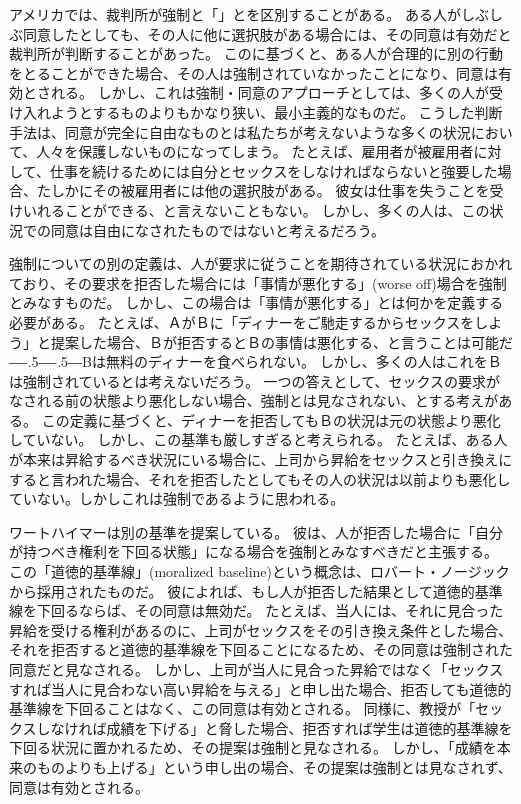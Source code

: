 \documentclass[paper=a4,book,openany]{jlreq}
\newcommand{\ig}[1]{}           %
\def\DDASH{―\kern-.5\zw―\kern-.5\zw―} %
\begin{document}
アメリカでは、裁判所が強制と「」とを区別することがある。
ある人がしぶしぶ同意したとしても、その人に他に選択肢がある場合には、その同意は有効だと裁判所が判断することがあった\citep[p.130]{buchhandler-raphael11:_failur_consen}。
このに基づくと、ある人が合理的に別の行動をとることができた場合、その人は強制されていなかったことになり、同意は有効とされる。
しかし、これは強制・同意のアプローチとしては、多くの人が受け入れようとするものよりもかなり狭い、最小主義的なものだ。
こうした判断手法は、同意が完全に自由なものとは私たちが考えないような多くの状況において、人々を保護しないものになってしまう。
たとえば、雇用者が被雇用者に対して、仕事を続けるためには自分とセックスをしなければならないと強要した場合、たしかにその被雇用者には他の選択肢がある。
彼女は仕事を失うことを受けいれることができる、と言えないこともない。
しかし、多くの人は、この状況での同意は自由になされたものではないと考えるだろう。

強制についての別の定義は、人が要求に従うことを期待されている状況におかれており、その要求を拒否した場合には「事情が悪化する」(worse off)場合を強制とみなすものだ。
しかし、この場合は「事情が悪化する」とは何かを定義する必要がある。
たとえば、ＡがＢに「ディナーをご馳走するからセックスをしよう」と提案した場合、Ｂが拒否するとＢの事情は悪化する、と言うことは可能だ{\DDASH}Bは無料のディナーを食べられない。
しかし、多くの人はこれをＢは強制されているとは考えないだろう。
一つの答えとして、セックスの要求がなされる前の状態より悪化しない場合、強制とは見なされない、とする考えがある。
この定義に基づくと、ディナーを拒否してもＢの状況は元の状態より悪化していない。
しかし、この基準も厳しすぎると考えられる。
たとえば、ある人が本来は昇給するべき状況にいる場合に、上司から昇給をセックスと引き換えにすると言われた場合、それを拒否したとしてもその人の状況は以前よりも悪化していない。しかしこれは強制であるように思われる。

ワートハイマーは別の基準を提案している。
彼は、人が拒否した場合に「自分が持つべき権利を下回る状態」になる場合を強制とみなすべきだと主張する。
この「道徳的基準線」(moralized baseline)という概念は、ロバート・ノージック\ig{Robert Nozick}から採用されたものだ。
彼によれば、もし人が拒否した結果として道徳的基準線を下回るならば、その同意は無効だ\citep[pp.167--169]{wertheimer03:_consen_sexual_relat}。
たとえば、当人には、それに見合った昇給を受ける権利があるのに、上司がセックスをその引き換え条件とした場合、それを拒否すると道徳的基準線を下回ることになるため、その同意は強制された同意だと見なされる。
しかし、上司が当人に見合った昇給ではなく「セックスすれば当人に見合わない高い昇給を与える」と申し出た場合、拒否しても道徳的基準線を下回ることはなく、この同意は有効とされる。
同様に、教授が「セックスしなければ成績を下げる」と脅した場合、拒否すれば学生は道徳的基準線を下回る状況に置かれるため、その提案は強制と見なされる。
しかし、「成績を本来のものよりも上げる」という申し出の場合、その提案は強制とは見なされず、同意は有効とされる。
\end{document}
